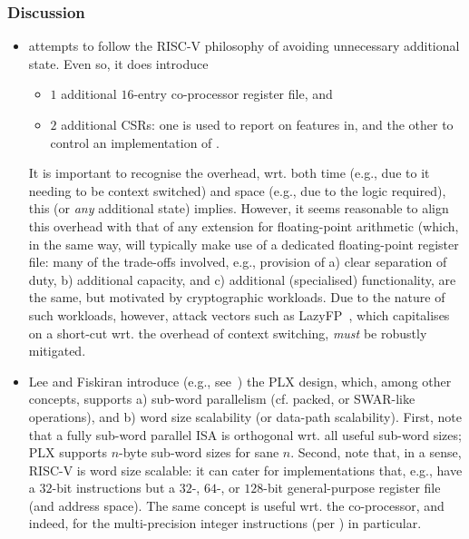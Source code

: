 
\subsubsection{Discussion}

\begin{itemize}

\item \XCID attempts to follow the RISC-V philosophy of avoiding unnecessary 
      additional state.  Even so, it does introduce

      \begin{itemize}
      \item $1$ additional $16$-entry co-processor register file,
            and
      \item $2$ additional CSRs: one is used to report on features in, and 
            the other to control an implementation of \XCID.
      \end{itemize}

      \noindent
      It is important to recognise 
      the overhead, wrt. both 
      time (e.g., due to it needing to be context switched) 
      and 
      space (e.g., due to the logic required),
      this (or {\em any} additional state) implies.
      However, it seems reasonable to align this overhead with that of any
      extension for floating-point arithmetic (which, in the same way, will
      typically make use of a dedicated floating-point register file: many 
      of the trade-offs involved, e.g., provision of
      a) clear separation of duty,
      b) additional capacity,
         and
      c) additional (specialised) functionality,
      are the same, but motivated by cryptographic workloads.
      Due to the nature of such workloads, however, attack vectors such as
      LazyFP~\cite{SCARV:StePre:18}, which capitalises on a short-cut wrt. 
      the overhead of context switching, {\em must} be robustly mitigated.

\item Lee and Fiskiran introduce (e.g., see~\cite{SCARV:LeeFis:05}) the PLX
      design, which, among other concepts, supports 
      a) sub-word parallelism (cf. packed, or SWAR-like operations),
         and
      b) word size scalability (or data-path scalability).
      First, 
      note that a fully sub-word parallel ISA is orthogonal wrt. all useful
      sub-word sizes; PLX supports $n$-byte sub-word sizes for sane $n$.
      Second,
      note that, in a sense, RISC-V is word size scalable: it can cater for
      implementations that, e.g., have a $32$-bit instructions but a $32$-,
      $64$-, or $128$-bit general-purpose register file (and address space).
      The same concept is useful wrt. the co-processor, and indeed, for the
      multi-precision integer instructions 
      (per )
      in particular.


\end{itemize}
